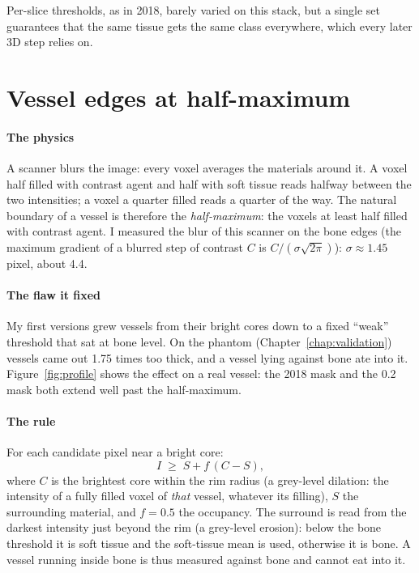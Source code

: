 Per-slice thresholds, as in 2018, barely varied on this stack, but a single set guarantees that the
same tissue gets the same class everywhere, which every later 3D step relies on.

\section{Vessel edges at half-maximum}
\label{sec:edges}

\paragraph{The physics} A scanner blurs the image: every voxel averages the materials around it. A
voxel half filled with contrast agent and half with soft tissue reads halfway between the two
intensities; a voxel a quarter filled reads a quarter of the way. The natural boundary of a vessel is
therefore the \emph{half-maximum}: the voxels at least half filled with contrast agent. I measured the
blur of this scanner on the bone edges (the maximum gradient of a blurred step of contrast $C$
is $C / (\sigma\sqrt{2\pi})$): $\sigma \approx 1.45$ pixel, about 4.4\um.

\paragraph{The flaw it fixed} My first versions grew vessels from their bright cores down to a fixed
``weak'' threshold that sat at bone level. On the phantom (Chapter~\ref{chap:validation}) vessels came
out 1.75 times too thick, and a vessel lying against bone ate into it. Figure~\ref{fig:profile} shows
the effect on a real vessel: the 2018 mask and the 0.2 mask both extend well past the half-maximum.

\paragraph{The rule} For each candidate pixel near a bright core:
\[
  I \;\ge\; S + f\,(C - S),
\]
where $C$ is the brightest core within the rim radius (a grey-level dilation: the intensity of a fully
filled voxel of \emph{that} vessel, whatever its filling), $S$ the surrounding material, and
$f = 0.5$ the occupancy. The surround is read from the darkest intensity just beyond the rim (a
grey-level erosion): below the bone threshold it is soft tissue and the soft-tissue mean is used,
otherwise it is bone. A vessel running inside bone is thus measured against bone and cannot eat into it.


